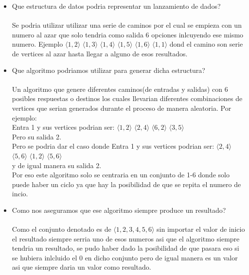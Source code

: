 \documentclass[20pt,a4paper]{article}
\begin{document}
 \begin{itemize}
        \item{Que estructura de datos podria representar un lanzamiento de dados?} \\ \\
       Se podria utilizar utilizar una serie de caminos por el cual se empieza con un numero  al azar que solo tendria 
        como salida 6 opciones inlcuyendo ese mismo numero. Ejemplo $\langle 1 ,2 \rangle$  $\langle 1 , 3 \rangle$  $\langle 1 , 4 \rangle$  $\langle 1 , 5 \rangle$  $\langle 1 , 6 \rangle$ $\langle 1 , 1 \rangle$ dond el camino son serie de vertices al azar hasta llegar a alguno de esos resultados.
        
        \item{Que algoritmo podriamos utilizar para generar dicha estructura?}\\ \\
        Un algoritmo que genere diferentes caminos(de entradas y salidas) con 6 posibles respuestas o destinos los cuales llevarian diferentes       combinaciones de vertices que serian generados durante el proceso  de manera aleatoria. Por ejemplo: \\
        Entra 1  y sus vertices podrian ser:
        $\langle 1 , 2 \rangle$  $\langle 2 , 4 \rangle$  $\langle 6 , 2 \rangle$  $\langle 3 , 5 \rangle$ \\
        Pero su salida 2.\\ 
        Pero se podria dar el caso donde         
        Entra 1  y sus vertices podrian ser:
        $\langle 2 ,4 \rangle$  $\langle 5 , 6 \rangle$  $\langle 1 , 2 \rangle$  $\langle 5,6  \rangle$ \\
        y de igual manera su salida 2. \\ 
        Por eso este algoritmo solo se centraria en un conjunto de 1-6 donde solo puede haber un ciclo ya que hay la posibilidad 
        de que se repita el numero de incio.
        
        \item{Como nos aseguramos que ese algoritmo siempre produce un resultado?}\\ \\
        Como el conjunto denotado es  de $\langle 1 , 2 , 3 , 4 , 5 , 6 \rangle$  sin importar el valor de inicio el resultado siempre serria uno de esos numeros asi que el algoritmo siempre tendria un resultado, se pudo haber dado la posibilidad de que pasara eso si se hubiera inlcluido el 0 en dicho conjunto pero de igual manera es un valor asi que siempre daria un valor como resultado.
        
        
\end{itemize}
\end{document}
